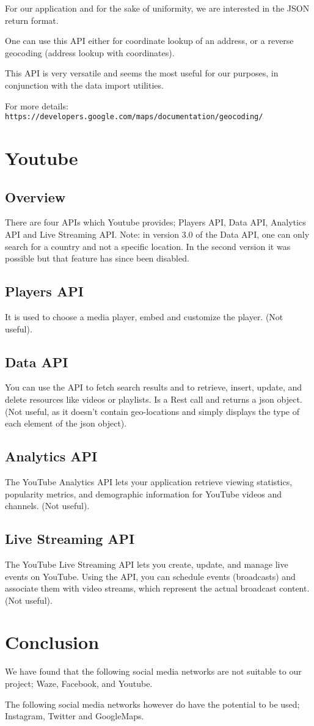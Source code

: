 \documentclass{article}
\begin{document}
For our application and for the sake of uniformity, we are interested in the JSON return format.

One can use this API either for coordinate lookup of an address, or a reverse geocoding (address lookup with coordinates).

This API is very versatile and seems the most useful for our purposes, in conjunction with the data import utilities.

For more details:
\noindent\texttt{https://developers.google.com/maps/documentation/geocoding/}

\section{Youtube}
\subsection{Overview}
There are four APIs which Youtube provides; Players API, Data API, Analytics API and Live Streaming API.
Note: in version 3.0 of the Data API, one can only search for a country and not a specific location. In the second version it was possible but that feature has since been disabled.
\subsection{Players API}
It is used to choose a media player, embed and customize the player. (Not useful).
\subsection{Data API}
You can use the API to fetch search results and to retrieve, insert, update, and delete resources like videos or playlists. Is a Rest call and returns a json object. (Not useful, as it doesn't contain geo-locations and simply displays the type of each element of the json object).
\subsection{Analytics API}
The YouTube Analytics API lets your application retrieve viewing statistics, popularity metrics, and demographic information for YouTube videos and channels. (Not useful).
\subsection{Live Streaming API}
The YouTube Live Streaming API lets you create, update, and manage live events on YouTube. Using the API, you can schedule events (broadcasts) and associate them with video streams, which represent the actual broadcast content. (Not useful).

\section{Conclusion}
We have found that the following social media networks are not suitable to our project; Waze, Facebook, and Youtube.

The following social media networks however do have the potential to be used; Instagram, Twitter and GoogleMaps.
\end{document}
